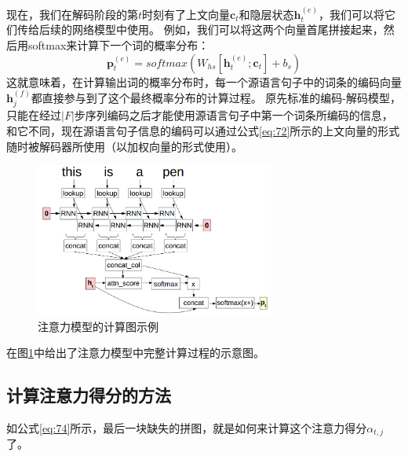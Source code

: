 \documentclass[10pt,a4paper]{ctexart}
\begin{document}
现在，我们在解码阶段的第$t$时刻有了上文向量$\textbf{c}_t$和隐层状态$\textbf{h}_t^{(e)}$，我们可以将它们传给后续的网络模型中使用。
例如，我们可以将这两个向量首尾拼接起来，然后用softmax来计算下一个词的概率分布：
\begin{equation}\label{eq:76}
 \textbf{p}_t^{(e)} = softmax(W_{hs}[\textbf{h}_t^{(e)};\textbf{c}_t] + b_s)
\end{equation}
这就意味着，在计算输出词的概率分布时，每一个源语言句子中的词条的编码向量$\textbf{h}_j^{(f)}$都直接参与到了这个最终概率分布的计算过程。
原先标准的编码-解码模型，只能在经过$|F|$步序列编码之后才能使用源语言句子中第一个词条所编码的信息，和它不同，现在源语言句子信息的编码可以通过公式\ref{eq:72}所示的上文向量的形式随时被解码器所使用（以加权向量的形式使用）。

\begin{figure}[H]
\centering
\includegraphics[width=0.7\textwidth]{fig28.png}
\caption{注意力模型的计算图示例}
\label{fig:28}
\end{figure}

在图\ref{fig:28}中给出了注意力模型中完整计算过程的示意图。

\subsection{计算注意力得分的方法}
如公式\ref{eq:74}所示，最后一块缺失的拼图，就是如何来计算这个注意力得分$\alpha_{t,j}$了。
\end{document}
